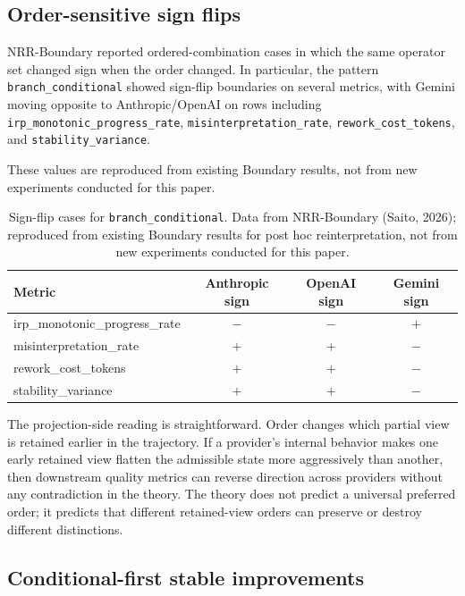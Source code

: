 \documentclass[11pt,a4paper]{article}
\begin{document}
\subsection{Order-sensitive sign flips}

NRR-Boundary reported ordered-combination cases in which the same operator set changed sign when the order changed. In particular, the pattern \texttt{branch\_conditional} showed sign-flip boundaries on several metrics, with Gemini moving opposite to Anthropic/OpenAI on rows including \texttt{irp\_monotonic\_progress\_rate}, \texttt{misinterpretation\_rate}, \texttt{rework\_cost\_tokens}, and \texttt{stability\_variance}.

These values are reproduced from existing Boundary results, not from new experiments conducted for this paper.

\begin{table}[h]
\centering
\small
\begin{tabular}{p{5.2cm}ccc}
\toprule
Metric & Anthropic sign & OpenAI sign & Gemini sign \\
\midrule
irp\_monotonic\_progress\_rate & $-$ & $-$ & $+$ \\
misinterpretation\_rate & $+$ & $+$ & $-$ \\
rework\_cost\_tokens & $+$ & $+$ & $-$ \\
stability\_variance & $+$ & $+$ & $-$ \\
\bottomrule
\end{tabular}
\caption{Sign-flip cases for \texttt{branch\_conditional}. Data from NRR-Boundary (Saito, 2026); reproduced from existing Boundary results for post hoc reinterpretation, not from new experiments conducted for this paper.}
\label{tab:boundary_signflip}
\end{table}

The projection-side reading is straightforward. Order changes which partial view is retained earlier in the trajectory. If a provider's internal behavior makes one early retained view flatten the admissible state more aggressively than another, then downstream quality metrics can reverse direction across providers without any contradiction in the theory. The theory does not predict a universal preferred order; it predicts that different retained-view orders can preserve or destroy different distinctions.

\subsection{Conditional-first stable improvements}
\end{document}
